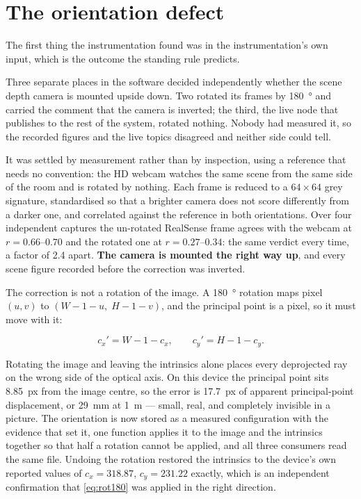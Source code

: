 \section{The orientation defect}
\label{sec:orientation}

The first thing the instrumentation found was in the instrumentation's own
input, which is the outcome the standing rule predicts.

Three separate places in the software decided independently whether the scene
depth camera is mounted upside down. Two rotated its frames by
\SI{180}{\degree} and carried the comment that the camera is inverted; the
third, the live node that publishes to the rest of the system, rotated
nothing. Nobody had measured it, so the recorded figures and the live topics
disagreed and neither side could tell.

It was settled by measurement rather than by inspection, using a reference
that needs no convention: the HD webcam watches the same scene from the same
side of the room and is rotated by nothing. Each frame is reduced to a
$64\times 64$ grey signature, standardised so that a brighter camera does not
score differently from a darker one, and correlated against the reference in
both orientations. Over four independent captures the un-rotated RealSense
frame agrees with the webcam at $r = \numrange{0.66}{0.70}$ and the rotated
one at $r = \numrange{0.27}{0.34}$: the same verdict every time, a factor of
\num{2.4} apart. \textbf{The camera is mounted the right way up}, and every
scene figure recorded before the correction was inverted.

The correction is not a rotation of the image. A \SI{180}{\degree} rotation
maps pixel $(u,v)$ to $(W\!-\!1\!-\!u,\; H\!-\!1\!-\!v)$, and the principal
point is a pixel, so it must move with it:

\begin{equation}
  \label{eq:rot180}
  c_x' = W - 1 - c_x, \qquad c_y' = H - 1 - c_y .
\end{equation}

Rotating the image and leaving the intrinsics alone places every deprojected
ray on the wrong side of the optical axis. On this device the principal point
sits \SI{8.85}{px} from the image centre, so the error is \SI{17.7}{px} of
apparent principal-point displacement, or \SI{29}{\milli\metre} at
\SI{1}{\metre} --- small, real, and completely invisible in a picture. The
orientation is now stored as a measured configuration with the evidence that
set it, one function applies it to the image and the intrinsics together so
that half a rotation cannot be applied, and all three consumers read the same
file. Undoing the rotation restored the intrinsics to the device's own
reported values of $c_x = \num{318.87}$, $c_y = \num{231.22}$ exactly, which
is an independent confirmation that \cref{eq:rot180} was applied in the right
direction.

